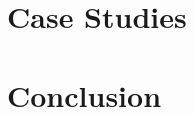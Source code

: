 \documentclass[11pt,twocolumn]{article}
\begin{document}
\section{Case Studies}

\section{Conclusion}


{}

\end{document}
